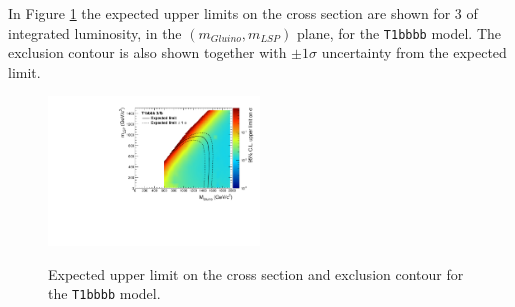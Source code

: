 In Figure \ref{fig:T1bbbb_plane_expected} the expected upper limits on the cross section are shown for 3 \ifb of integrated luminosity, in the $(m_{Gluino},m_{LSP})$ plane, for the \texttt{T1bbbb} model. 
The exclusion contour is also shown together with $\pm1\sigma$ uncertainty from the expected limit. 

\begin{figure}
  \begin{center}
    \includegraphics[width=0.5\textwidth]{figures/susyResults/xs_contour_withHisto} \\
    \caption{Expected upper limit on the cross section and exclusion contour for the \texttt{T1bbbb} model.}
    \label{fig:T1bbbb_plane_expected}
  \end{center}
\end{figure}





